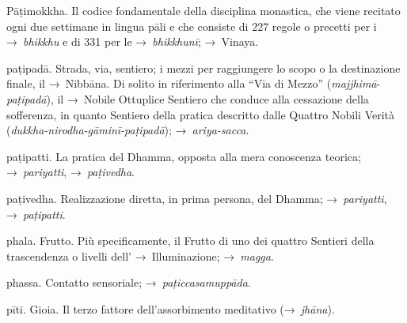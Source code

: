 \begin{glossarydescription}
\item[Pāṭimokkha.] Il codice fondamentale della disciplina monastica, che
  viene recitato ogni due settimane in lingua pāli e che consiste di 227 regole
  o precetti per i →~\emph{bhikkhu} e di 331 per le →~\emph{bhikkhunī};
  →~Vinaya.

\item[paṭipadā.] Strada, via, sentiero; i mezzi per raggiungere lo scopo o
  la destinazione finale, il →~Nibbāna. Di solito in riferimento alla
  ``Via di Mezzo'' (\emph{majjhimā}-\emph{paṭipadā}), il →~Nobile Ottuplice
  Sentiero che conduce alla cessazione della sofferenza, in quanto Sentiero
  della pratica descritto dalle Quattro Nobili Verità
  (\emph{dukkha-nirodha-gāminī-paṭipadā}); →~\emph{ariya-sacca}.

\item[paṭipatti.] La pratica del Dhamma, opposta alla mera conoscenza
  teorica; →~\emph{pariyatti}, →~\emph{paṭivedha}.

\item[paṭivedha.] Realizzazione diretta, in prima persona, del Dhamma;
  →~\emph{pariyatti}, →~\emph{paṭipatti}.

\item[phala.] Frutto. Più specificamente, il Frutto di uno dei quattro
  Sentieri della trascendenza o livelli dell' →~Illuminazione; →~\emph{magga}.

\item[phassa.] Contatto sensoriale; →~\emph{paṭiccasamuppāda}.

\item[pīti.] Gioia. Il terzo fattore dell'assorbimento meditativo
  (→~\emph{jhāna}).


\end{glossarydescription}
